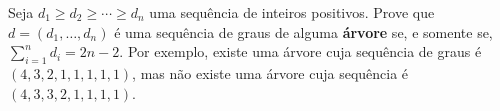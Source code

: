 Seja $d_1 \geq d_2 \geq \cdots \geq d_n$ uma sequência de inteiros positivos. Prove que $d = (d_1, \ldots, d_n)$ é uma sequência de graus de alguma \textbf{árvore} se, e somente se, $\sum_{i=1}^n d_i = 2n - 2$. Por exemplo, existe uma árvore cuja sequência de graus é $(4,3,2,1,1,1,1,1)$, mas não existe uma árvore cuja sequência é $(4,3,3,2,1,1,1,1)$.

\itemdsep
